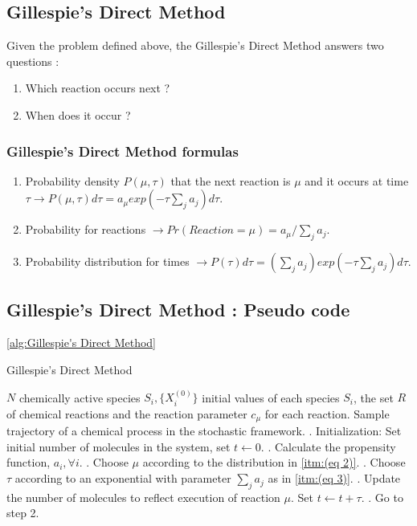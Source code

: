 \documentclass[11pt,a4paper]{article}
\begin{document}
\subsection{Gillespie's Direct Method}
Given the problem defined above, the Gillespie's Direct Method answers two questions :
\begin{enumerate}
  \item Which reaction occurs next ?
  \item When does it occur ?
\end{enumerate}

  \subsubsection{Gillespie's Direct Method formulas}
  \begin{enumerate}
    \item Probability density $P(\mu, \tau)$ that the next reaction is $\mu$ and it occurs at time $\tau \rightarrow P(\mu, \tau)d\tau = a_{\mu}exp(-\tau \sum_{j}a_{j})d\tau$. \label{itm:(eq 1)}
    \item Probability for reactions $\rightarrow Pr(Reaction = \mu) = a_{\mu} / \sum_{j}a_{j}$. \label{itm:(eq 2)}
    \item Probability distribution for times $\rightarrow P(\tau)d\tau = (\sum_{j}a_{j})exp(-\tau \sum_{j}a_{j})d\tau$.\label{itm:(eq 3)}
  \end{enumerate}

\subsection{Gillespie's Direct Method : Pseudo code} \ref{alg:Gillespie's Direct Method}
\begin{algorithm}[!h]                     %
\caption{Gillespie's Direct Method}       %
\begin{algorithmic}                       %
\REQUIRE $N$ chemically active species $S_i, \{X_{i}^{(0)}\}$ initial values of each species $S_i$, the set $R$ \hspace*{8mm} of chemical reactions and the reaction parameter $c_{\mu}$ for each reaction.
\ENSURE Sample trajectory of a chemical process in the stochastic framework.
    . Initialization: Set initial number of molecules in the system, set $t \leftarrow 0$.
    . Calculate the propensity function, $a_{i},  \forall i$.
    . Choose $\mu$ according to the distribution in \ref{itm:(eq 2)}.
    . Choose $\tau$ according to an exponential with parameter $\sum_{j}a_{j}$ as in \ref{itm:(eq 3)}.
    . Update the number of molecules to reflect execution of reaction $\mu$. Set $t \leftarrow t + \tau$.
    . Go to step 2.
\ENDWHILE
\end{algorithmic}
\label{alg:Gillespie's Direct Method}
\end{algorithm}
\end{document}
